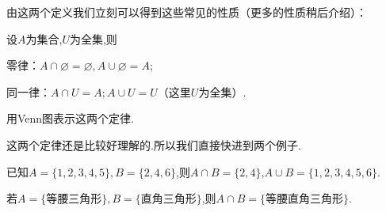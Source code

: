\documentclass[lang=cn,math=cm,chinesefont=nofont,11pt,scheme=chinese,twocol]{elegantbook}
\begin{document}
由这两个定义我们立刻可以得到这些常见的性质（更多的性质稍后介绍）：

设$A$为集合,$U$为全集,则
\begin{property}
  零律：$A\cap\varnothing =\varnothing,A\cup\varnothing=A$;
\end{property}
\begin{property}
  同一律：$A\cap U=A;A\cup U=U$（这里$U$为全集）.
\end{property}

\begin{exercise}\label{exer:10}
  用Venn图表示这两个定律.
\end{exercise}


这两个定律还是比较好理解的.所以我们直接快进到两个例子.

\begin{example}
  已知$A=\{1,2,3,4,5\},B=\{2,4,6\}$,则$A\cap B=\{2,4\}$,$A\cup B=\{1,2,3,4,5,6\}$.
\end{example}

\begin{example}
  若$A=\{\text{等腰三角形}\},B=\{\text{直角三角形}\}$,则$A\cap B=\{\text{等腰直角三角形}\}.$
\end{example}
\end{document}
